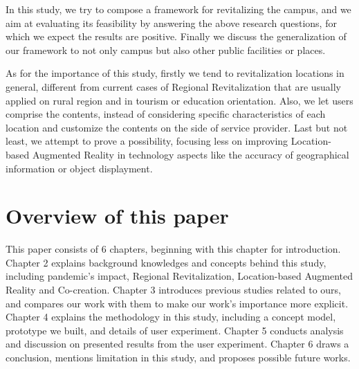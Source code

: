 
In this study, we try to compose a framework for revitalizing the campus, and we aim at evaluating its feasibility by answering the above research questions, for which we expect the results are positive.
Finally we discuss the generalization of our framework to not only campus but also other public facilities or places.


As for the importance of this study, firstly we tend to revitalization locations in general, different from current cases of Regional Revitalization that are usually applied on rural region and in tourism or education orientation.
Also, we let users comprise the contents, instead of considering specific characteristics of each location and customize the contents on the side of service provider.
Last but not least, we attempt to prove a possibility, focusing less on improving Location-based Augmented Reality in technology aspects like the accuracy of geographical information or object displayment.

\section{Overview of this paper}
This paper consists of 6 chapters, beginning with this chapter for introduction.
Chapter 2 explains background knowledges and concepts behind this study, including pandemic's impact, Regional Revitalization, Location-based Augmented Reality and Co-creation.
Chapter 3 introduces previous studies related to ours, and compares our work with them to make our work's importance more explicit.
Chapter 4 explains the methodology in this study, including a concept model, prototype we built, and details of user experiment.
Chapter 5 conducts analysis and discussion on presented results from the user experiment.
Chapter 6 draws a conclusion, mentions limitation in this study, and proposes possible future works.
